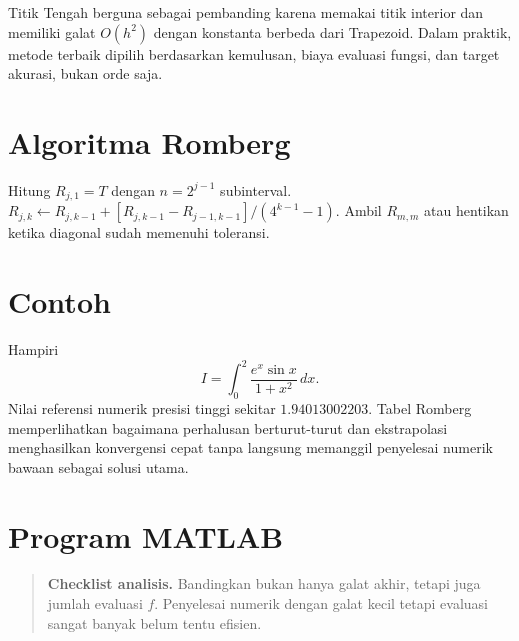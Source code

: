\documentclass[book,english,noindex,lean,nobackpage,nocopyright,noupdate,nofiglist,notablist]{enacom}
\newcommand{\AnalysisCheck}[1]{\begin{quote}\textbf{Checklist analisis.} #1\end{quote}}
\begin{document}
Titik Tengah berguna sebagai pembanding karena memakai titik interior dan memiliki galat $O(h^2)$ dengan konstanta berbeda dari Trapezoid. Dalam praktik, metode terbaik dipilih berdasarkan kemulusan, biaya evaluasi fungsi, dan target akurasi, bukan orde saja.

\section{Algoritma Romberg}
\begin{algorithm}
\caption{Integrasi Romberg}
\begin{algorithmic}[1]
\State Hitung $R_{j,1}=T$ dengan $n=2^{j-1}$ subinterval.
\State $R_{j,k}\gets R_{j,k-1}+[R_{j,k-1}-R_{j-1,k-1}]/(4^{k-1}-1)$.
\EndFor
\EndFor
\State Ambil $R_{m,m}$ atau hentikan ketika diagonal sudah memenuhi toleransi.
\end{algorithmic}
\end{algorithm}

\section{Contoh}
Hampiri
\begin{equation}
I=\int_0^2\frac{e^x\sin x}{1+x^2}\,dx.
\end{equation}
Nilai referensi numerik presisi tinggi sekitar $1.94013002203$. Tabel Romberg memperlihatkan bagaimana perhalusan berturut-turut dan ekstrapolasi menghasilkan konvergensi cepat tanpa langsung memanggil penyelesai numerik bawaan sebagai solusi utama.

\section{Program MATLAB}



\AnalysisCheck{Bandingkan bukan hanya galat akhir, tetapi juga jumlah evaluasi $f$. Penyelesai numerik dengan galat kecil tetapi evaluasi sangat banyak belum tentu efisien.}
\end{document}
